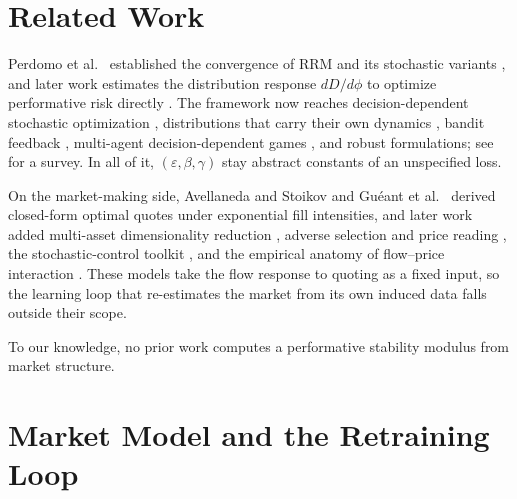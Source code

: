 \documentclass[sigconf,anonymous,review]{acmart}
\newcommand{\eps}{\varepsilon}
\begin{document}
\section{Related Work}
\label{sec:related}

Perdomo et al.\ \cite{perdomo2020performative} established the convergence of
RRM and its stochastic variants \cite{mendlerdunner2020stochastic}, and later
work estimates the distribution response $dD/d\phi$ to optimize performative
risk directly \cite{izzo2021learn,miller2021echo}. The framework now reaches
decision-dependent stochastic optimization \cite{drusvyatskiy2023stochastic},
distributions that carry their own dynamics
\cite{li2022state,brown2022stateful}, bandit feedback
\cite{jagadeesan2022regret}, multi-agent decision-dependent games
\cite{narang2022multiplayer}, and robust formulations; see
\cite{hardt2023performative} for a survey. In all of it,
$(\eps,\beta,\gamma)$ stay abstract constants of an unspecified loss.

On the market-making side, Avellaneda and Stoikov
\cite{avellaneda2008highfrequency} and Gu\'eant et al.\
\cite{gueant2013dealing} derived closed-form optimal quotes under exponential
fill intensities, and later work added multi-asset dimensionality reduction
\cite{bergault2021size}, adverse selection and price reading
\cite{barzykin2025adverse}, the stochastic-control toolkit
\cite{cartea2015algorithmic}, and the empirical anatomy of flow--price
interaction \cite{cont2014price}. These models take the flow response to
quoting as a fixed input, so the learning loop that re-estimates the market
from its own induced data falls outside their scope.

To our knowledge, no prior work computes a performative stability modulus
from market structure.

\section{Market Model and the Retraining Loop}
\label{sec:model}
\end{document}
